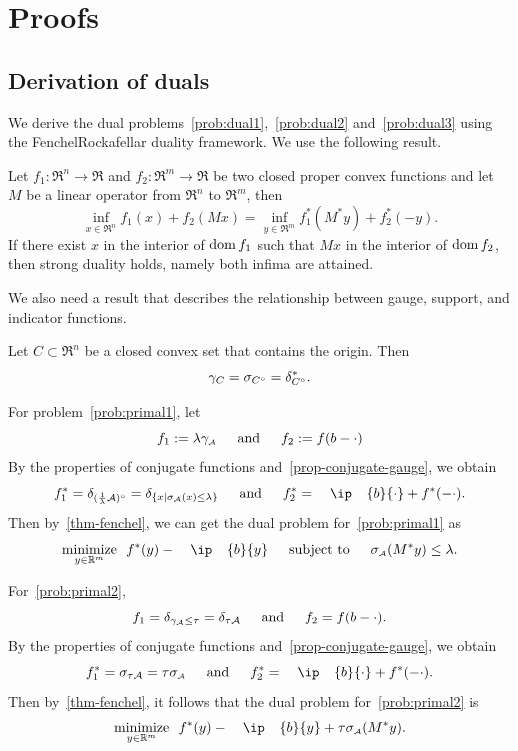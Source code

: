 \section{Proofs}

\subsection{Derivation of duals}\label{app:duals}

We derive the dual problems~\eqref{prob:dual1},~\eqref{prob:dual2} and~\eqref{prob:dual3} using the Fenchel\textendash Rockafellar duality framework. We use the following result.
\begin{theorem}\label{thm-fenchel}
  Let $f_1:\Re^n\to\Re$ and $f_2:\Re^m\to\Re$ be two closed proper convex functions and let $M$ be a linear operator from $\Re^n$ to $\Re^m$, then
  \[\inf_{x \in \Re^n} f_1(x) + f_2(Mx) = \inf_{y \in \Re^m} f_1^*(M^*y) + f_2^*(-y).\]
  If there exist $x$ in the interior of $\operatorname{dom} f_1$ such that $Mx$ in the interior of $\operatorname{dom} f_2$, then strong duality holds, namely both infima are attained. 
\end{theorem}
We also need a result that describes the relationship between gauge, support, and indicator functions. 
\begin{proposition} \label{prop-conjugate-gauge}
  Let $C\subset\Re^n$ be a closed convex set that contains the origin. Then 
  \[\gamma_C = \sigma_{C^\circ}=\delta_{C^\circ}^*.\]
\end{proposition}

For problem~\eqref{prob:primal1}, let
\[
  f_1 := \lambda\gamma_{\scriptscriptstyle\mathcal{A}} \enspace\hbox{\quad and\quad}\enspace f_2 := f(b - \cdot)
\]
By the properties of conjugate functions and~\autoref{prop-conjugate-gauge}, we obtain 
\[
  f_1^* =  \delta_{(\frac{1}{\lambda}\Ascr)^\circ} = \delta_{\{x\mid \sigma\As(x)\leq\lambda\}} \enspace\text{and}\enspace f_2^* = \ip{b}{\cdot} + f^*(-\cdot).
\]
Then by~\autoref{thm-fenchel}, we can get the dual problem for~\eqref{prob:primal1} as
\[\minimize{y\in\Re^m} f^*(y) - \ip{b}{y} \enspace\text{subject to}\enspace \sigma\As(M^*y)\leq\lambda.\]

For~\eqref{prob:primal2},
\[f_1 = \delta_{\gamma_{\scriptscriptstyle\mathcal{A}}\leq\tau} = \delta_{\tau\mathcal{A}} \enspace\hbox{\quad and\quad}\enspace f_2 = f(b - \cdot).
\]
By the properties of conjugate functions and~\autoref{prop-conjugate-gauge}, we obtain 
\[f_1^* = \sigma_{\tau\Ascr} = \tau\sigma\As \enspace\text{and}\enspace f_2^* = \ip{b}{\cdot} + f^*(-\cdot).
\]
Then by~\autoref{thm-fenchel}, it follows that the dual problem for~\eqref{prob:primal2} is 
\[\minimize{y\in\Re^m} f^*(y) - \ip{b}{y} + \tau\sigma\As(M^*y).\]

